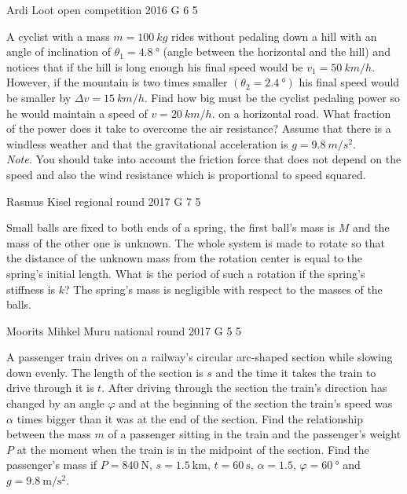 \documentclass[11pt]{article}
\begin{document}
{Ardi Loot} %
{open competition} %
{2016} %
{G 6} %
{5} %
{

\ifEngStatement
A cyclist with a mass $m=\SI{100}{kg}$ rides without pedaling down a hill with an angle of inclination of $\theta_{1}=\SI{4.8}{\degree}$ (angle between the horizontal and the hill) and notices that if the hill is long enough his final speed would be $v_{1}=\SI{50}{km/h}$. However, if the mountain is two times smaller $(\theta_{2}=\SI{2.4}{\degree})$ his final speed would be smaller by $\Delta v=\SI{15}{km/h}$. Find how big must be the cyclist pedaling power so he would maintain a speed of $v=\SI{20}{km/h}.$ on a horizontal road. What fraction of the power does it take to overcome the air resistance? Assume that there is a windless weather and that the gravitational acceleration is $g=\SI{9.8}{m/s^{2}}$. \\
\emph{Note.} You should take into account the friction force that does not depend on the speed and also the wind resistance which is proportional to speed squared.
\fi
}

{Rasmus Kisel} %
{regional round} %
{2017} %
{G 7} %
{5} %
{

\ifEngStatement
Small balls are fixed to both ends of a spring, the first ball’s mass is $M$ and the mass of the other one is unknown. The whole system is made to rotate so that the distance of the unknown mass from the rotation center is equal to the spring’s initial length. What is the period of such a rotation if the spring’s stiffness is $k$? The spring’s mass is negligible with respect to the masses of the balls.
\fi
}

{Moorits Mihkel Muru} %
{national round} %
{2017} %
{G 5} %
{5} %
{

\ifEngStatement
A passenger train drives on a railway’s circular arc-shaped section while slowing down evenly. The length of the section is $s$ and the time it takes the train to drive through it is $t$. After driving through the section the train’s direction has changed by an angle $\varphi$ and at the beginning of the section the train’s speed was $\alpha$ times bigger than it was at the end of the section. Find the relationship between the mass $m$ of a passenger sitting in the train and the passenger’s weight $P$ at the moment when the train is in the midpoint of the section. Find the passenger’s mass if $P=\SI{840}{\newton}$, $s=\SI{1.5}{\kilo\meter}$, $t=\SI{60}{\second}$, $\alpha=\num{1.5}$, $\varphi=\SI{60}{\degree}$ and $g=\SI{9.8}{\meter\per\second\squared}$.
\fi
}
\end{document}
